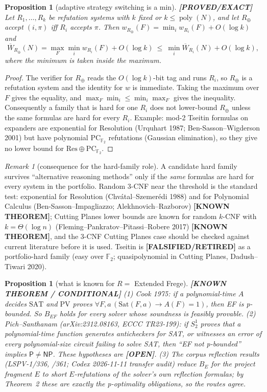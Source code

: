 \documentclass[11pt]{article}
\newtheorem{proposition}[theorem]{Proposition}
\theoremstyle{remark}
\newtheorem*{remark}{Remark}
\newcommand{\SAT}{\mathrm{SAT}}
\newcommand{\poly}{\operatorname{poly}}
\newcommand{\Wbar}{\overline W}
\newcommand{\status}[1]{\textbf{[#1]}}
\begin{document}
\begin{proposition}[adaptive strategy switching is a min]\status{PROVED/EXACT}
Let $R_1,\dots,R_k$ be refutation systems with $k$ fixed or $k\le\poly(N)$, and
let $R_\oplus$ accept $(i,\pi)$ iff $R_i$ accepts $\pi$. Then
$w_{R_\oplus}(F)=\min_i w_{R_i}(F)+O(\log k)$ and
\[
 \Wbar_{R_\oplus}(N)=\max_F\min_i w_{R_i}(F)+O(\log k)\ \le\ \min_i\Wbar_{R_i}(N)+O(\log k),
\]
where the minimum is taken \emph{inside} the maximum.
\end{proposition}
\begin{proof}
The verifier for $R_\oplus$ reads the $O(\log k)$-bit tag and runs $R_i$, so
$R_\oplus$ is a refutation system and the identity for $w$ is immediate. Taking
the maximum over $F$ gives the equality, and $\max_F\min_i\le\min_i\max_F$ gives the
inequality. Consequently a family that is hard for one $R_i$ does not lower-bound
$R_\oplus$ unless the same formulas are hard for every $R_i$. Example: mod-2 Tseitin
formulas on expanders are exponential for Resolution (Urquhart 1987;
Ben-Sasson--Wigderson 2001) but have polynomial $\mathrm{PC}_{\mathbb F_2}$
refutations (Gaussian elimination), so they give no lower bound for
$\mathrm{Res}\oplus\mathrm{PC}_{\mathbb F_2}$.
\end{proof}
\begin{remark}[consequence for the hard-family role]
A candidate hard family survives ``alternative reasoning methods'' only if the
\emph{same} formulas are hard for every system in the portfolio. Random 3-CNF
near the threshold is the standard test: exponential for Resolution
(Chv\'atal--Szemer\'edi 1988) and for Polynomial Calculus (Ben-Sasson--Impagliazzo;
Alekhnovich--Razborov) \status{KNOWN THEOREM}; Cutting Planes lower bounds are
known for random $k$-CNF with $k=\Theta(\log n)$ (Fleming--Pankratov--Pitassi--Robere
2017) \status{KNOWN THEOREM}, and the 3-CNF Cutting Planes case should be checked
against current literature before it is used. Tseitin is \status{FALSIFIED/RETIRED}
as a portfolio-hard family (easy over $\mathbb F_2$; quasipolynomial in Cutting
Planes, Dadush--Tiwari 2020).
\end{remark}

\begin{proposition}[what is known for $R=$ Extended Frege]\status{KNOWN THEOREM / CONDITIONAL}
(1) Cook 1975: if a polynomial-time $A$ decides $\SAT$ and $\mathrm{PV}$ proves
$\forall F,a\,(\mathrm{Sat}(F,a)\to A(F)=1)$, then EF is p-bounded. So $B_{EF}$
holds for every solver whose soundness is feasibly provable.
(2) Pich--Santhanam (arXiv:2312.08163, ECCC TR23-199): if $S^1_2$ proves that a
polynomial-time function generates anticheckers for SAT, or witnesses an error
of every polynomial-size circuit failing to solve SAT, then ``EF not p-bounded''
implies $\mathsf P\neq\mathsf{NP}$. These hypotheses are \status{OPEN}.
(3) The corpus reflection results (LSPV-1/336, /361; Codex 2026-11-11 transfer
audit) reduce $B_E$ for the project fragment $E$ to short $E$-refutations of the
solver's own reflection formulas; by Theorem~2 these are exactly the
p-optimality obligations, so the routes agree.
\end{proposition}
\end{document}
